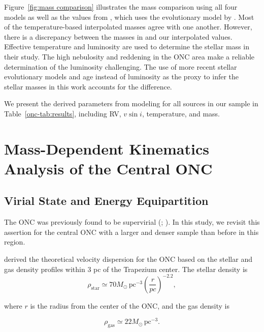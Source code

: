 \documentclass[12pt]{ucsddissertation}
\begin{document}
\begin{CJK*}{UTF8}{gbsn}
Figure~\ref{fig:mass comparison} illustrates the mass comparison using all four models as well as the values from \citet{Hillenbrand-1997}, which uses the evolutionary model by \citet{D'Antona-1994}. Most of the temperature-based interpolated masses agree with one another. However, there is a discrepancy between the masses in \citet{Hillenbrand-1997} and our interpolated values. Effective temperature and luminosity are used to determine the stellar mass in their study. The high nebulosity and reddening in the ONC area make a reliable determination of the luminosity challenging. The use of more recent stellar evolutionary models and age instead of luminosity as the proxy to infer the stellar masses in this work accounts for the difference.

We present the derived parameters from modeling for all sources in our sample in Table~\ref{onc-tab:results}, including RV, $v\sin i$, temperature, and mass.

\section{Mass-Dependent Kinematics Analysis of the Central ONC}
\label{onc-sec:analysis}

\subsection{Virial State and Energy Equipartition}
\label{onc-subsec:virial}

The ONC was previously found to be supervirial (\citealt{Scally-2005, DaRio-2014, Kounkel-2018}; ). In this study, we revisit this assertion for the central ONC with a larger and denser sample than before in this region.

\citet{DaRio-2014} derived the theoretical velocity dispersion for the ONC based on the stellar and gas density profiles within $3$ pc of the Trapezium center. The stellar density is 
\begin{equation}
    \label{eq:star}
    \rho_\mathrm{star}\simeq70M_\odot\, \mathrm{pc}^{-3} \left(\frac{r}{pc}\right)^{-2.2},
\end{equation}

\noindent where $r$ is the radius from the center of the ONC, and the gas density is

\begin{equation}
    \label{eq:gas}
    \rho_\mathrm{gas}\simeq22M_\odot \, \mathrm{pc}^{-3}.
\end{equation}


\end{CJK*}
\end{document}

